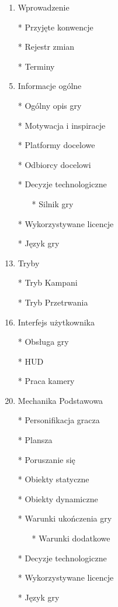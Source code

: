\documentclass{article}
\begin{document}
\newpage
{}
\begin{enumerate}
	\item Wprowadzenie
	    \item[*] Przyjęte konwencje
	    \item[*] Rejestr zmian
	    \item[*] Terminy
	\item Informacje ogólne
	    \item[*] Ogólny opis gry
	    \item[*] Motywacja i inspiracje
	    \item[*] Platformy docelowe
	    \item[*] Odbiorcy docelowi
	    \item[*] Decyzje technologiczne
	       \begin{enumerate}
	    \item[*] Silnik gry
	    \end{enumerate}
	    \item[*] Wykorzystywane licencje
	    \item[*] Język gry
	\item Tryby
	    \item[*] Tryb Kampani
	    \item[*] Tryb Przetrwania
    \item Interfejs użytkownika
        \item[*] Obsługa gry
	    \item[*] HUD
	    \item[*] Praca kamery
	    
	\item Mechanika Podstawowa
	    \item[*] Personifikacja gracza
	    \item[*] Plansza
	    \item[*] Poruszanie się
	    \item[*] Obiekty statyczne 
	    
	    \item[*] Obiekty dynamiczne 
	    
	    \item[*] Warunki ukończenia gry 
	    \begin{enumerate}
	    \item[*] Warunki dodatkowe
	    \end{enumerate}
	    
	    \item[*] Decyzje technologiczne
	    \item[*] Wykorzystywane licencje
	    \item[*] Język gry
	    

\end{enumerate}
\end{document}
